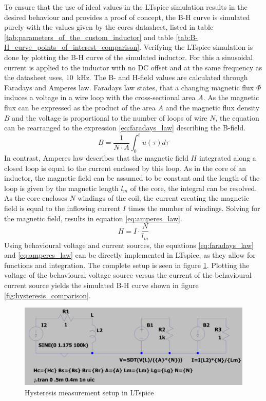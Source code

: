 To ensure that the use of ideal values in the LTspice simulation results in the desired behaviour and provides a proof of concept, the B-H curve is simulated purely with the values given by the cores datasheet, listed in table \ref{tab:parameters_of_the_custom_inductor} and table \ref{tab:B-H_curve_points_of_interest_comparison}. Verifying the LTspice simulation is done by plotting the B-H curve of the simulated inductor. For this a sinusoidal current is applied to the inductor with no \ac{DC} offset and at the same frequency as the datasheet uses, \SI{10}{\kilo\Hz}. The B- and H-field values are calculated through Faradays and Amperes law. Faradays law states, that a changing magnetic flux $\Phi$ induces a voltage in a wire loop with the cross-sectional area $A$. As the magnetic flux can be expressed as the product of the area $A$ and the magnetic flux density $B$ and the voltage is proportional to the number of loops of wire $N$, the equation can be rearranged to the expression \ref{eq:faradays_law} describing the B-field. 
\begin{equation}
	B = \frac{1}{N \cdot A} \int_0^t u(\tau)d\tau \label{eq:faradays_law}    
\end{equation}
In contrast, Amperes law describes that the magnetic field $H$ integrated along a closed loop is equal to the current enclosed by this loop. As in the core of an inductor, the magnetic field can be assumed to be constant and the length of the loop is given by the magnetic length $l_m$ of the core, the integral can be resolved. As the core encloses $N$ windings of the coil, the current creating the magnetic field is equal to the inflowing current $I$ times the number of windings. Solving for the magnetic field, results in equation \ref{eq:amperes_law}.
\begin{equation}
	H = I \cdot \frac{N}{l_m} \label{eq:amperes_law}
\end{equation}
Using behavioural voltage and current sources, the equations \ref{eq:faradays_law} and \ref{eq:amperes_law} can be directly implemented in LTspice, as they allow for functions and integration. The complete setup is seen in figure \ref{fig:hysteresis_measurement_setup_in_LTspice}. Plotting the voltage of the behavioural voltage source versus the current of the behavioural current source yields the simulated B-H curve shown in figure \ref{fig:hysteresis_comparison}.
\begin{figure}[H]
    \centering
    \includegraphics[width=.9\linewidth]{Bilder//Kapitel3/Hysteresis_Measurement_Setup_LTspice.png}
    \caption{Hysteresis measurement setup in LTspice}
    \label{fig:hysteresis_measurement_setup_in_LTspice}
\end{figure}
